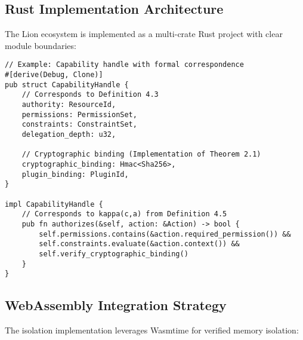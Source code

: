 \subsection{Rust Implementation Architecture}

The Lion ecosystem is implemented as a multi-crate Rust project with clear module boundaries:

\begin{lstlisting}[style=rust,caption={Capability Handle Implementation}]
// Example: Capability handle with formal correspondence
#[derive(Debug, Clone)]
pub struct CapabilityHandle {
    // Corresponds to Definition 4.3
    authority: ResourceId,
    permissions: PermissionSet,
    constraints: ConstraintSet,
    delegation_depth: u32,
    
    // Cryptographic binding (Implementation of Theorem 2.1)
    cryptographic_binding: Hmac<Sha256>,
    plugin_binding: PluginId,
}

impl CapabilityHandle {
    // Corresponds to kappa(c,a) from Definition 4.5
    pub fn authorizes(&self, action: &Action) -> bool {
        self.permissions.contains(&action.required_permission()) &&
        self.constraints.evaluate(&action.context()) &&
        self.verify_cryptographic_binding()
    }
}
\end{lstlisting}

\subsection{WebAssembly Integration Strategy}

The isolation implementation leverages Wasmtime for verified memory isolation:


